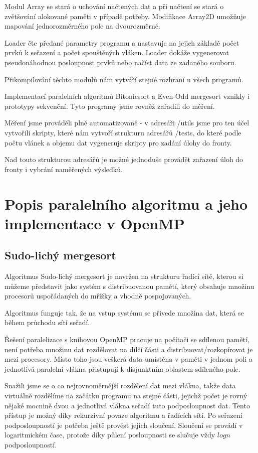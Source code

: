 \documentclass[12pt]{article}
\begin{document}
Modul Array se stará o uchování načtených dat a při načtení se stará o zvětšování alokované paměti 
v případě potřeby. Modifikace Array2D umožňuje mapování jednorozměrného pole na dvourozměrné.

Loader čte předané parametry programu a nastavuje na jejich základě počet prvků k seřazení a počet
spouštěných vláken. Loader dokáže vygenerovat pseudonáhodnou posloupnost prvků nebo načíst data ze zadaného
souboru.

Přikompilování těchto modulů nám vytváří stejné rozhraní u všech programů.

Implementací paralelních algoritmů Bitonicsort a Even-Odd mergesort vznikly i prototypy sekvenční.
Tyto programy jsme rovněž zařadili do měření.

Měření jsme prováděli plně automatizovaně - v adresáři /utils jsme pro ten účel vytvořili skripty,
které nám vytvoří strukturu adresářů /tests, do které podle počtu vlánek a objemu dat vygeneruje
skripty pro zadání úlohy do fronty.

Nad touto strukturou adresářů je možné jednoduše provádět zařazení úloh do fronty i vybrání naměřených
výsledků.

\section{Popis paralelního algoritmu a jeho implementace v OpenMP}
\subsection{Sudo-lichý mergesort}
Algoritmus Sudo-lichý mergesort je navržen na strukturu řadící sítě, kterou si můžeme představit jako
systém s distribuovanou pamětí, který obsahuje množinu procesorů uspořádaných do mřížky a vhodně pospojovaných.

Algoritmus funguje tak, že na vstup systému se přivede množina dat, která se během průchodu sítí seřadí.

Řešení paralelizace s knihovou OpenMP pracuje na počítači se sdílenou pamětí, není potřeba množinu dat
rozdělovat na dílčí části a distribuovat/rozkopírovat je mezi procesory. Místo toho jsou veškerá data
umístěna v paměti v jednom poli a jednotlivá paralelní vlákna přistupují k disjunktním oblastem sdíleného
pole.

Snažili jsme se o co nejrovnoměrnější rozdělení dat mezi vlákna, takže data virtuálně rozdělíme na začátku
programu na stejné části, jejichž počet je rovný nějaké mocnině dvou a jednotlivá vlákna seřadí tuto podposloupnost
dat. Tento přístup je možný díky rekurzivní povaze algoritmu a řadících sítí.
Po seřazení podposloupností je potřeba ještě provést jejich sloučení. Sloučení se provádí v logaritmickém čase,
protože díky půlení posloupnosti se slučuje vždy \(log n\) podposloupností.
\end{document}
